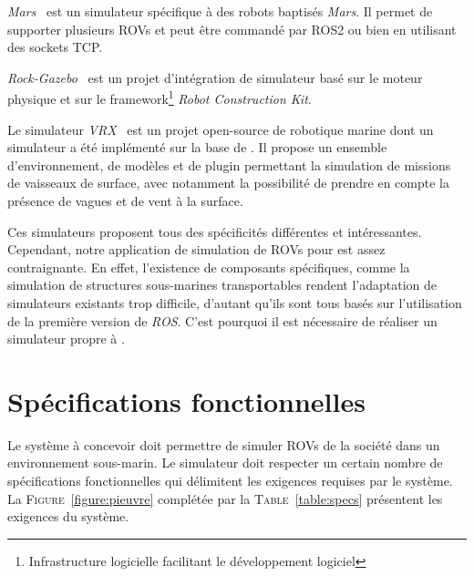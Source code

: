         \textit{Mars}~\cite{MARS} est un simulateur spécifique à des robots baptisés \textit{Mars}. Il permet de supporter plusieurs \gls{ROV}s et peut être commandé par \gls{ROS2} ou bien en utilisant des sockets TCP.
        
        \textit{Rock-Gazebo}~\cite{Rock} est un projet d'intégration de simulateur basé sur le moteur physique \gazebo{} et sur le framework\footnote{Infrastructure logicielle facilitant le développement logiciel} \textit{Robot Construction Kit}.
        
        Le simulateur \textit{VRX}~\cite{bingham19toward} est un projet open-source de robotique marine dont un simulateur a été implémenté sur la base de \gazebo{}. Il propose un ensemble d'environnement, de modèles et de plugin permettant la simulation de missions de vaisseaux de surface, avec notamment la possibilité de prendre en compte la présence de vagues et de vent à la surface.

        Ces simulateurs proposent tous des spécificités différentes et intéressantes. Cependant, notre application de simulation de \gls{ROV}s pour \forssea{} est assez contraignante. En effet, l'existence de composants spécifiques, comme la simulation de structures sous-marines transportables rendent l'adaptation de simulateurs existants trop difficile, d'autant qu'ils sont tous basés sur l'utilisation de la première version de \textit{ROS}. C'est pourquoi il est nécessaire de réaliser un simulateur propre à \forssea{}.

    \section{Spécifications fonctionnelles}
        \label{sec:spec_fonc}

        Le système à concevoir doit permettre de simuler \gls{ROV}s de la société \forssea{} dans un environnement sous-marin. Le simulateur doit respecter un certain nombre de spécifications fonctionnelles qui délimitent les exigences requises par le système. La \textsc{Figure}~\ref{figure:pieuvre} complétée par la \textsc{Table}~\ref{table:specs} présentent les exigences du système.

